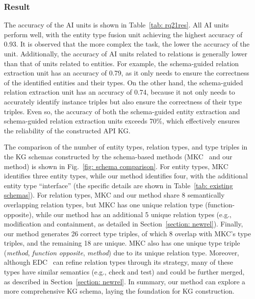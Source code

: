 \subsubsection{Result}
The accuracy of the AI units is shown in Table~\ref{tab: rq21res}.
All AI units perform well, with the entity type fusion unit achieving the highest accuracy of 0.93.
It is observed that the more complex the task, the lower the accuracy of the unit.
Additionally, the accuracy of AI units related to relations is generally lower than that of units related to entities.
For example, the schema-guided relation extraction unit has an accuracy of 0.79, as it only needs to ensure the correctness of the identified entities and their types.
On the other hand, the schema-guided relation extraction unit has an accuracy of 0.74, because it not only needs to accurately identify instance triples but also ensure the correctness of their type triples.
Even so, the accuracy of both the schema-guided entity extraction and schema-guided relation extraction units exceeds 70\%, which effectively ensures the reliability of the constructed API KG.

The comparison of the number of entity types, relation types, and type triples in the KG schemas constructed by the schema-based methods (MKC~\cite{Manual} and our method) is shown in Fig.~\ref{fig: schema comparison}.
For entity types, MKC identifies three entity types, while our method identifies four, with the additional entity type ``interface'' (the specific details are shown in Table~\ref{tab: existing schemas}).
For relation types, MKC and our method share 8 semantically overlapping relation types, but MKC has one unique relation type (function-opposite), while our method has an additional 5 unique relation types (e.g., modification and containment, as detailed in Section~\ref{section: newrel}).
Finally, our method generates 26 correct type triples, of which 8 overlap with MKC's type triples, and the remaining 18 are unique.
MKC also has one unique type triple (\textit{method}, \textit{function opposite}, \textit{method}) due to its unique relation type.
Moreover, although EDC~\cite{EDC} can refine relation types through its strategy, many of these types have similar semantics (e.g., check and test) and could be further merged, as described in Section~\ref{section: newrel}.
In summary, our method can explore a more comprehensive KG schema, laying the foundation for KG construction.

